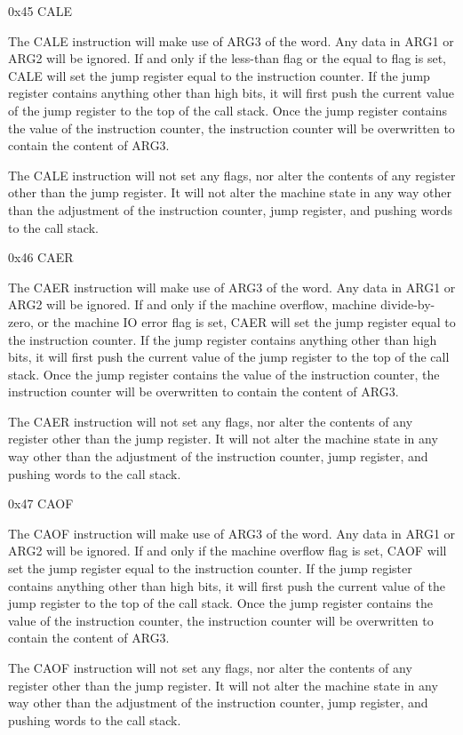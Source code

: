 \documentclass[]{article}
\begin{document}
0x45 CALE

The CALE instruction will make use of ARG3 of the word. Any data in ARG1
or ARG2 will be ignored. If and only if the less-than flag or the equal
to flag is set, CALE will set the jump register equal to the instruction
counter. If the jump register contains anything other than high bits, it
will first push the current value of the jump register to the top of the
call stack. Once the jump register contains the value of the instruction
counter, the instruction counter will be overwritten to contain the
content of ARG3.

The CALE instruction will not set any flags, nor alter the contents of
any register other than the jump register. It will not alter the machine
state in any way other than the adjustment of the instruction counter,
jump register, and pushing words to the call stack.

0x46 CAER

The CAER instruction will make use of ARG3 of the word. Any data in ARG1
or ARG2 will be ignored. If and only if the machine overflow, machine
divide-by-zero, or the machine IO error flag is set, CAER will set the
jump register equal to the instruction counter. If the jump register
contains anything other than high bits, it will first push the current
value of the jump register to the top of the call stack. Once the jump
register contains the value of the instruction counter, the instruction
counter will be overwritten to contain the content of ARG3.

The CAER instruction will not set any flags, nor alter the contents of
any register other than the jump register. It will not alter the machine
state in any way other than the adjustment of the instruction counter,
jump register, and pushing words to the call stack.

0x47 CAOF

The CAOF instruction will make use of ARG3 of the word. Any data in ARG1
or ARG2 will be ignored. If and only if the machine overflow flag is
set, CAOF will set the jump register equal to the instruction counter.
If the jump register contains anything other than high bits, it will
first push the current value of the jump register to the top of the call
stack. Once the jump register contains the value of the instruction
counter, the instruction counter will be overwritten to contain the
content of ARG3.

The CAOF instruction will not set any flags, nor alter the contents of
any register other than the jump register. It will not alter the machine
state in any way other than the adjustment of the instruction counter,
jump register, and pushing words to the call stack.
\end{document}
